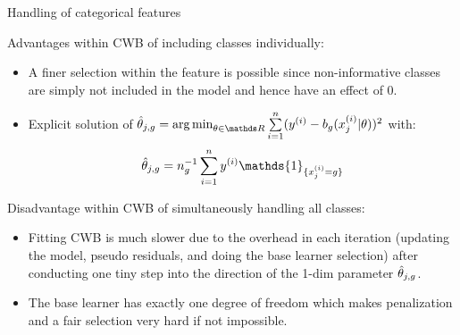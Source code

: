 \documentclass[11pt,compress,t,notes=noshow, xcolor=table]{beamer}
\begin{document}
\begin{vbframe}{Handling of categorical features}
\framebreak

Advantages within CWB of including classes individually: 
\begin{itemize}
    \item 
        A finer selection within the feature is possible since non-informative classes are simply not included in the model and hence have an effect of $0$.

    \item 
        Explicit solution of $\thetah_{j,g} = \argmin_{\theta\in\R}\sumin (\yi - b_g(x^{(i)}_j|\theta))^2$ with:
        $$\thetah_{j,g} = n_g^{-1}\sumin \yi \mathds{1}_{\{x^{(i)}_j = g\}}$$
\end{itemize}

Disadvantage within CWB of simultaneously handling all classes:
\begin{itemize}
    \item 
        Fitting CWB is much slower due to the overhead in each iteration (updating the model, pseudo residuals, and doing the base learner selection) after conducting one tiny step into the direction of the 1-dim parameter $\hat{\theta}_{j,g}$.

    \item 
        The base learner has exactly one degree of freedom which makes penalization and a fair selection very hard if not impossible.
\end{itemize}

\end{vbframe}

\end{document}
